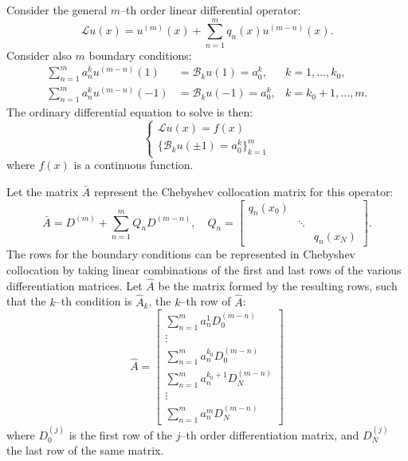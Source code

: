 \documentclass{sfuthesis}
\begin{document}
Consider the general $m$--th order linear differential operator:
\begin{equation} \label{general operator}
\mathcal{L} u(x) = u^{(m)}(x) + \sum_{n = 1}^m q_n(x) u^{(m-n)}(x) .
\end{equation}
Consider also $m$ boundary conditions:
\begin{equation}
\begin{aligned}
\sum_{n = 1}^m a_n^k u^{(m-n)}(1) & = \mathcal{B}_k u(1) = a_0^k, & k = 1,...,k_0 , \\
\sum_{n = 1}^m a_n^k u^{(m-n)}(-1) & = \mathcal{B}_k u(-1) = a_0^k, & k = k_0+1,...,m .
\end{aligned}
\end{equation}
The ordinary differential equation to solve is then:
\begin{equation}
\begin{cases} \mathcal{L} u(x) = f(x) \\ \{ \mathcal{B}_k u(\pm 1) = a_0^k \}_{k=1}^m \end{cases}
\end{equation}
where $f(x)$ is a continuous function.

Let the matrix $\bar{A}$ represent the Chebyshev collocation matrix for this operator:
\begin{equation} \label{eq:Abar}
\bar{A} = D^{(m)} + \sum_{n=1}^m Q_n D^{(m-n)}, \quad Q_n = \begin{bmatrix} q_n(x_0) & & \\ & \ddots & \\ & & q_n(x_N) \end{bmatrix} .
\end{equation}
The rows for the boundary conditions can be represented in Chebyshev collocation by taking linear combinations of the first and last rows of the various differentiation matrices.
Let $\hat{A}$ be the matrix formed by the resulting rows, such that the $k$--th condition is $\hat{A}_k$, the $k$--th row of $\hat{A}$:
\begin{equation} \label{eq:Ahat}
\hat{A} = \begin{bmatrix} \sum_{n = 1}^m a_n^1 D^{(m-n)}_0 \\ \vdots \\ 
\sum_{n = 1}^m a_n^{k_0} D^{(m-n)}_0 \\[10pt]
\sum_{n = 1}^m a_n^{k_0+1} D^{(m-n)}_N \\ \vdots \\
\sum_{n = 1}^m a_n^m D^{(m-n)}_N \end{bmatrix}
\end{equation}
where $D^{(j)}_0$ is the first row of the $j$--th order differentiation matrix, and $D^{(j)}_N$ the last row of the same matrix.
\end{document}
